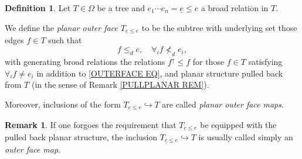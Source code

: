 \documentclass[a4paper,10pt
,draft
]{article}%
\numberwithin{equation}{section}
\numberwithin{figure}{section}
\theoremstyle{definition} %
\newtheorem{definition}[equation]{Definition}%
\newtheorem{remark}[equation]{Remark}%
\newcommand{\1}{\ensuremath{\mathbbm 1}}%
\begin{document}
\begin{definition}\label{OUTFACE DEF}
	Let $T \in \Omega$ be a tree and 
	$e_1 \cdots e_n =\underline{e} \leq e$ a broad relation in $T$.
	
	We define the \textit{planar outer face $T_{\underline{e} \leq e}$}
	to be the subtree with underlying set those edges $f \in T$ such that
\begin{equation}\label{OUTERFACE EQ}
	f \leq_d e,\quad \forall_i f \nless_d e_i,
\end{equation}
with generating broad relations the relations $f^{\uparrow} \leq f$ for those $f \in T$ satisfying
$\forall_i f\neq e_i$
in addition to \eqref{OUTERFACE EQ},
and planar structure pulled back from $T$ (in the sense of Remark \ref{PULLPLANAR REM}).

Moreover, inclusions of the form 
$T_{\underline{e} \leq e}
\hookrightarrow T$
are called \emph{planar outer face maps}.
\end{definition}


\begin{remark}
If one forgoes the requirement that $T_{\underline{e} \leq e}$ be equipped with the pulled back planar structure, the inclusion $T_{\underline{e} \leq e} \hookrightarrow T$ is usually called simply an \textit{outer face map}.
\end{remark}
\end{document}

